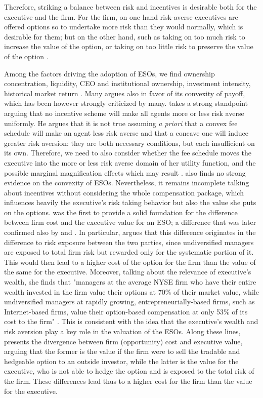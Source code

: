     Therefore, striking a balance between risk and incentives is desirable both for the executive and the firm. For the firm, on one hand risk-averse executives are offered options so to undertake more risk than they would normally, which is desirable for them; but on the other hand, such as taking on too much risk to increase the value of the option, or taking on too little risk to preserve the value of the option \cite{grinblatt1989adverse}.

    Among the factors driving the adoption of ESOs, we find ownership concentration, liquidity, CEO and institutional ownership, investment intensity, historical market return \cite{pasternack2002factors}. Many argues also in favor of its convexity of payoff, which has been however strongly criticized by many. \cite{ross2004compensation} takes a strong standpoint arguing that no incentive scheme will make all agents more or less risk averse uniformly. He argues that it is not true assuming \textit{a priori} that a convex fee schedule will make an agent less risk averse and that a concave one will induce greater risk aversion: they are both necessary conditions, but each insufficient on its own. Therefore, we need to also consider whether the fee schedule moves the executive into the more or less risk averse domain of her utility function, and the possible marginal magnification effects which may result \cite{ross2004compensation}. \cite{hayes2012stock} also finds no strong evidence on the convexity of ESOs. 
    Nevertheless, it remains incomplete talking about incentives without considering the whole compensation package, which influences heavily the executive's risk taking behavior but also the value she puts on the options. \cite{carpenter1998exercise} was the first to provide a solid foundation for the difference between firm cost and the executive value for an ESO; a difference that was later confirmed also by \cite{meulbroek2001efficiency} and \cite{hall2003trouble}. In particular, \cite{meulbroek2001efficiency} argues that this difference originates in the difference to risk exposure between the two parties, since undiversified managers are exposed to total firm risk but rewarded only for the systematic portion of it. This would then lead to a higher cost of the option for the firm than the value of the same for the executive. Moreover, talking about the relevance of executive's wealth, she finds that "managers at the average NYSE firm who have their entire wealth invested in the firm value their options at 70\% of their market value, while undiversified managers at rapidly growing, entrepreneurially-based firms, such as Internet-based firms, value their option-based compensation at only 53\% of its cost to the firm" \cite{meulbroek2001efficiency}. This is consistent with the idea that the executive's wealth and risk aversion play a key role in the valuation of the ESOs. Along these lines, \cite{hall2002stock} presents the divergence between firm (opportunity) cost and executive value, arguing that the former is the value if the firm were to sell the tradable and hedgeable option to an outside investor, while the latter is the value for the executive, who is not able to hedge the option and is exposed to the total risk of the firm. These differences lead thus to a higher cost for the firm than the value for the executive.
